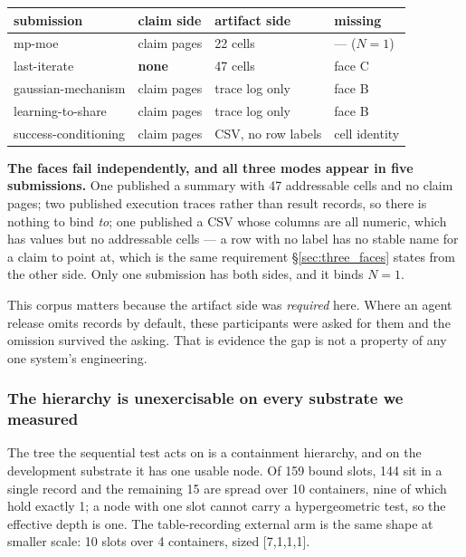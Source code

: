 \documentclass[10pt]{article}
\newcommand{\RM}[1]{{#1}}
\begin{document}
\begin{center}
\small
\begin{tabular}{@{}llll@{}}
\toprule
submission & claim side & artifact side & missing \\
\midrule
mp-moe            & claim pages & \RM{22} cells   & --- ($N=\RM{1}$) \\
last-iterate      & \textbf{none}        & \RM{47} cells   & face C \\
gaussian-mechanism & claim pages & trace log only  & face B \\
learning-to-share  & claim pages & trace log only  & face B \\
success-conditioning & claim pages & CSV, no row labels & cell identity \\
\bottomrule
\end{tabular}
\end{center}

\noindent \textbf{The faces fail independently, and all three modes appear in
five submissions.} One published a summary with \RM{47} addressable cells and no
claim pages; two published execution traces rather than result records, so there
is nothing to bind \emph{to}; one published a CSV whose columns are all numeric,
which has values but no addressable cells --- a row with no label has no stable
name for a claim to point at, which is the same requirement \S\ref{sec:three_faces}
states from the other side. Only one submission has both sides, and it binds
$N=\RM{1}$.

This corpus matters because the artifact side was \emph{required} here. Where an
agent release omits records by default, these participants were asked for them
and the omission survived the asking. That is evidence the gap is not a
property of any one system's engineering.

\subsubsection{The hierarchy is unexercisable on every substrate we measured}
\label{sec:e11}
The tree the sequential test acts on is a containment hierarchy, and on the
development substrate it has one usable node. Of \RM{159} bound slots,
\RM{144} sit in a single record and the remaining \RM{15} are spread over
\RM{10} containers, nine of which hold exactly \RM{1}; a
node with one slot cannot carry a hypergeometric test, so the effective depth is
one. The table-recording external arm is the same shape at smaller scale:
\RM{10} slots over \RM{4} containers, sized \RM{[7,1,1,1]}.
\end{document}
